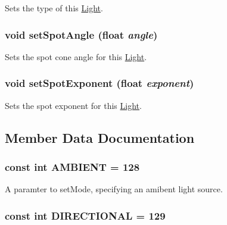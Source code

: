 Sets the type of this \hyperlink{classm3g_1_1Light}{Light}. \hypertarget{classm3g_1_1Light_30ce206b37f6ed5e918fbc75b3f91072}{
\subsubsection[{setSpotAngle}]{\setlength{\rightskip}{0pt plus 5cm}void setSpotAngle (float {\em angle})}}
\label{classm3g_1_1Light_30ce206b37f6ed5e918fbc75b3f91072}


Sets the spot cone angle for this \hyperlink{classm3g_1_1Light}{Light}. \hypertarget{classm3g_1_1Light_787eb66801e17d0412559598326ce19d}{
\subsubsection[{setSpotExponent}]{\setlength{\rightskip}{0pt plus 5cm}void setSpotExponent (float {\em exponent})}}
\label{classm3g_1_1Light_787eb66801e17d0412559598326ce19d}


Sets the spot exponent for this \hyperlink{classm3g_1_1Light}{Light}. 

\subsection{Member Data Documentation}
\hypertarget{classm3g_1_1Light_4cf648a82d9de62a1fb15f4277049594}{
\subsubsection[{AMBIENT}]{\setlength{\rightskip}{0pt plus 5cm}const int {\bf AMBIENT} = 128}}
\label{classm3g_1_1Light_4cf648a82d9de62a1fb15f4277049594}


A paramter to setMode, specifying an amibent light source. \hypertarget{classm3g_1_1Light_a2fb668ca8bbeb8323eda98fba594fda}{
\subsubsection[{DIRECTIONAL}]{\setlength{\rightskip}{0pt plus 5cm}const int {\bf DIRECTIONAL} = 129}}
\label{classm3g_1_1Light_a2fb668ca8bbeb8323eda98fba594fda}


